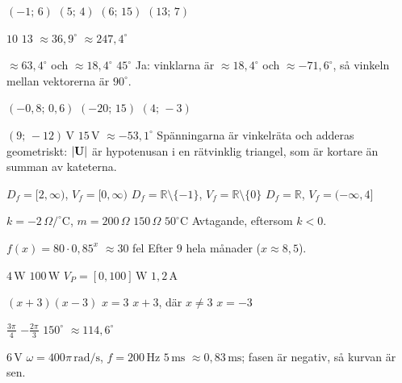 
\begin{facit}

  $(-1;\,6)$  $(5;\,4)$  $(6;\,15)$  $(13;\,7)$

  $10$  $13$  $\approx 36{,}9^{\circ}$  $\approx 247{,}4^{\circ}$

  $\approx 63{,}4^{\circ}$ och $\approx 18{,}4^{\circ}$  $45^{\circ}$
 Ja: vinklarna är $\approx 18{,}4^{\circ}$ och $\approx -71{,}6^{\circ}$, så vinkeln mellan
vektorerna är $90^{\circ}$.

  $(-0{,}8;\,0{,}6)$  $(-20;\,15)$  $(4;\,-3)$

  $(9;\,-12)\,\text{V}$  $15\,\text{V}$  $\approx -53{,}1^{\circ}$
 Spänningarna är vinkelräta och adderas geometriskt: $\lvert\mathbf{U}\rvert$ är hypotenusan i en
rätvinklig triangel, som är kortare än summan av kateterna.

  $D_f = [2, \infty)$, $V_f = [0, \infty)$
 $D_f = \mathbb{R} \setminus \{-1\}$, $V_f = \mathbb{R} \setminus \{0\}$
 $D_f = \mathbb{R}$, $V_f = (-\infty, 4]$

  $k = -2\,\Omega/^{\circ}\text{C}$, $m = 200\,\Omega$  $150\,\Omega$
 $50^{\circ}\text{C}$  Avtagande, eftersom $k < 0$.

  $f(x) = 80 \cdot 0{,}85^x$  $\approx 30$ fel
 Efter $9$ hela månader ($x \approx 8{,}5$).

  $4\,\text{W}$  $100\,\text{W}$  $V_P = [0, 100]\,\text{W}$
 $1{,}2\,\text{A}$

  $(x + 3)(x - 3)$  $x = 3$  $x + 3$, där $x \neq 3$  $x = -3$

  $\frac{3\pi}{4}$  $-\frac{2\pi}{3}$  $150^{\circ}$
 $\approx 114{,}6^{\circ}$

  $6\,\text{V}$  $\omega = 400\pi\,\text{rad/s}$, $f = 200\,\text{Hz}$
 $5\,\text{ms}$  $\approx 0{,}83\,\text{ms}$; fasen är negativ, så kurvan är sen.


\end{facit}
